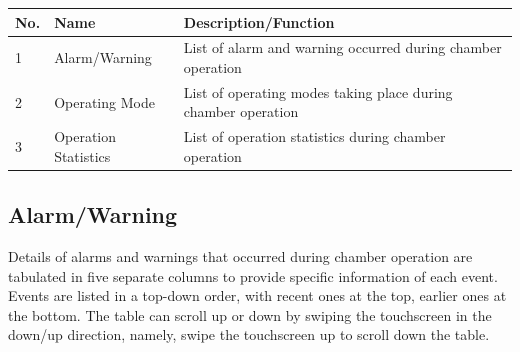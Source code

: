 \begin{longtable}[]{@{}lll@{}}
\toprule
\begin{minipage}[b]{0.17\columnwidth}\raggedright
No.\strut
\end{minipage} & \begin{minipage}[b]{0.22\columnwidth}\raggedright
Name\strut
\end{minipage} & \begin{minipage}[b]{0.52\columnwidth}\raggedright
Description/Function\strut
\end{minipage}\tabularnewline
\midrule
\endhead
\begin{minipage}[t]{0.17\columnwidth}\raggedright
1\strut
\end{minipage} & \begin{minipage}[t]{0.22\columnwidth}\raggedright
Alarm/Warning\strut
\end{minipage} & \begin{minipage}[t]{0.52\columnwidth}\raggedright
List of alarm and warning occurred during chamber operation\strut
\end{minipage}\tabularnewline
\begin{minipage}[t]{0.17\columnwidth}\raggedright
2\strut
\end{minipage} & \begin{minipage}[t]{0.22\columnwidth}\raggedright
Operating Mode\strut
\end{minipage} & \begin{minipage}[t]{0.52\columnwidth}\raggedright
List of operating modes taking place during chamber operation\strut
\end{minipage}\tabularnewline
\begin{minipage}[t]{0.17\columnwidth}\raggedright
3\strut
\end{minipage} & \begin{minipage}[t]{0.22\columnwidth}\raggedright
Operation Statistics\strut
\end{minipage} & \begin{minipage}[t]{0.52\columnwidth}\raggedright
List of operation statistics during chamber operation\strut
\end{minipage}\tabularnewline
\bottomrule
\end{longtable}


\subsection{Alarm/Warning}

Details of alarms and warnings that occurred during chamber operation
are tabulated in five separate columns to provide specific information
of each event. Events are listed in a top-down order, with recent ones
at the top, earlier ones at the bottom. The table can scroll up or down
by swiping the touchscreen in the down/up direction, namely, swipe the
touchscreen up to scroll down the table.

